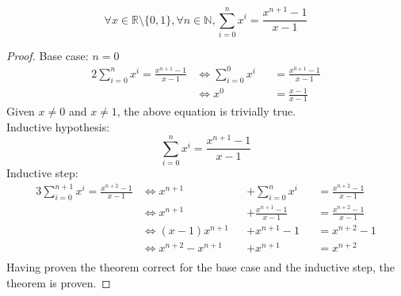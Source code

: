 \documentclass[docid=PA01]{tcom_PA}
\begin{document}
\setcounter{chapter}{0}
\begin{theorem}
	\begin{equation*}
		\forall x \in \mathbb{R}\setminus \{0,1\},\forall n \in \mathbb{N}, \sum_{i=0}^{n}{x^i} = \frac{x^{n+1}-1}{x-1}
	\end{equation*}
\end{theorem}
\begin{proof}
Base case: $n=0$
\begin{alignat*}{2}
	\sum_{i=0}^{n}{x^i} = \frac{x^{n+1}-1}{x-1}
	&\iff \sum_{i=0}^{0}{x^i} &&= \frac{x^{0+1}-1}{x-1}\\
	&\iff x^0                 &&= \frac{x-1}{x-1}
\end{alignat*}
Given $x \neq 0$ and $x \neq 1$, the above equation is trivially true.\\
Inductive hypothesis:
\begin{equation*}
\sum_{i=0}^{n}{x^i} = \frac{x^{n+1}-1}{x-1}
\end{equation*}
Inductive step:
\begin{alignat*}{3}
	\sum_{i=0}^{n+1}{x^i} = \frac{x^{n+2}-1}{x-1}
	&\iff x^{n+1}         &&+\sum_{i=0}^{n}{x^i}   &&= \frac{x^{n+2}-1}{x-1}\\
	&\iff x^{n+1}         &&+\frac{x^{n+1}-1}{x-1} &&= \frac{x^{n+2}-1}{x-1}\\
	&\iff (x-1)x^{n+1}    &&+x^{n+1}-1             &&= x^{n+2}-1\\
	&\iff x^{n+2}-x^{n+1} &&+x^{n+1}               &&= x^{n+2}\\
\end{alignat*}
Having proven the theorem correct for the base case and the inductive step, the theorem is proven.
\end{proof}
\end{document}
